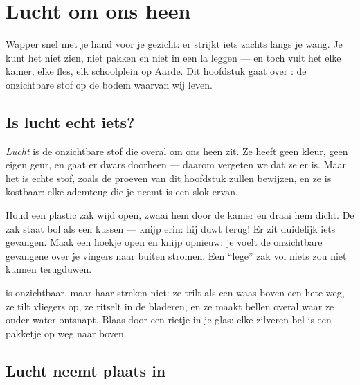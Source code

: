 \chapter{Lucht om ons heen}\label{ch:g2:air-around-us}

Wapper snel met je hand voor je gezicht: er strijkt iets zachts langs
je wang. Je kunt het niet zien, niet pakken en niet in een la leggen
--- en toch vult het elke kamer, elke fles, elk schoolplein op Aarde.
Dit hoofdstuk gaat over : de onzichtbare stof op de bodem waarvan
wij leven.

\section{Is lucht echt iets?}

\begin{definition}[Lucht]\label{def:g2:air-around-us:air}
\emph{Lucht} is de onzichtbare stof die overal om ons
heen zit. Ze heeft geen kleur, geen eigen geur, en  gaat er
dwars doorheen --- daarom vergeten we dat ze er is. Maar het is echte
stof, zoals de proeven van dit hoofdstuk zullen bewijzen, en ze is
kostbaar: elke ademteug die je neemt is een slok ervan.
\end{definition}

\begin{example}\label{ex:g2:air-around-us:catch}
Houd een plastic zak wijd open, zwaai hem door de kamer en draai hem
dicht. De zak staat bol als een kussen --- knijp erin: hij duwt terug!
Er zit duidelijk iets gevangen. Maak een hoekje open en knijp opnieuw:
je voelt de onzichtbare gevangene over je vingers naar buiten stromen.
Een ``lege'' zak vol niets zou niet kunnen terugduwen.
\end{example}

\begin{example}\label{ex:g2:air-around-us:shows}
 is onzichtbaar, maar haar streken niet: ze trilt als een
waas boven een hete weg, ze tilt vliegers op, ze ritselt in de
bladeren, en ze maakt bellen overal waar ze onder water ontsnapt. Blaas
door een rietje in je glas: elke zilveren bel is een pakketje
 op weg naar boven.
\end{example}

\section{Lucht neemt plaats in}

